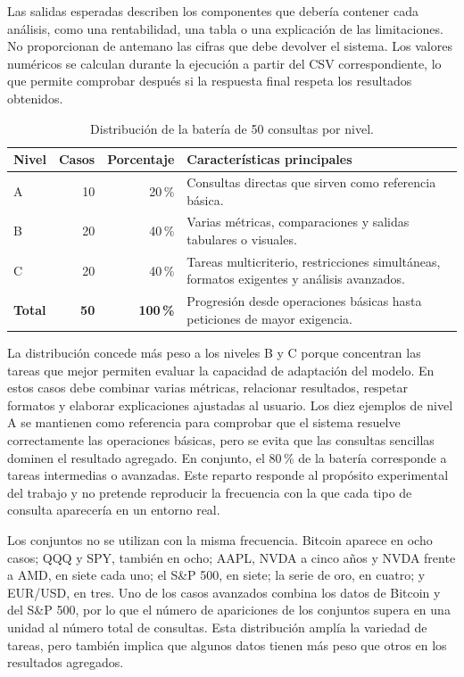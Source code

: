 Las salidas esperadas describen los componentes que debería contener cada análisis, como una rentabilidad, una tabla o una explicación de las limitaciones. No proporcionan de antemano las cifras que debe devolver el sistema. Los valores numéricos se calculan durante la ejecución a partir del CSV correspondiente, lo que permite comprobar después si la respuesta final respeta los resultados obtenidos.

\begin{table}[htbp]
\centering
\small
\begin{tabularx}{\textwidth}{L{0.13\textwidth}r r Y}
\toprule
\textbf{Nivel} & \textbf{Casos} & \textbf{Porcentaje} & \textbf{Características principales} \\
\midrule
A & 10 & 20\,\% & Consultas directas que sirven como referencia básica. \\
B & 20 & 40\,\% & Varias métricas, comparaciones y salidas tabulares o visuales. \\
C & 20 & 40\,\% & Tareas multicriterio, restricciones simultáneas, formatos exigentes y análisis avanzados. \\
\midrule
\textbf{Total} & \textbf{50} & \textbf{100\,\%} & Progresión desde operaciones básicas hasta peticiones de mayor exigencia. \\
\bottomrule
\end{tabularx}
\caption{Distribución de la batería de 50 consultas por nivel.}
\label{tab:distribucion_bateria_50}
\end{table}

La distribución concede más peso a los niveles B y C porque concentran las tareas que mejor permiten evaluar la capacidad de adaptación del modelo. En estos casos debe combinar varias métricas, relacionar resultados, respetar formatos y elaborar explicaciones ajustadas al usuario. Los diez ejemplos de nivel A se mantienen como referencia para comprobar que el sistema resuelve correctamente las operaciones básicas, pero se evita que las consultas sencillas dominen el resultado agregado. En conjunto, el 80\,\% de la batería corresponde a tareas intermedias o avanzadas. Este reparto responde al propósito experimental del trabajo y no pretende reproducir la frecuencia con la que cada tipo de consulta aparecería en un entorno real.

Los conjuntos no se utilizan con la misma frecuencia. Bitcoin aparece en ocho casos; QQQ y SPY, también en ocho; AAPL, NVDA a cinco años y NVDA frente a AMD, en siete cada uno; el S\&P 500, en siete; la serie de oro, en cuatro; y EUR/USD, en tres. Uno de los casos avanzados combina los datos de Bitcoin y del S\&P 500, por lo que el número de apariciones de los conjuntos supera en una unidad al número total de consultas. Esta distribución amplía la variedad de tareas, pero también implica que algunos datos tienen más peso que otros en los resultados agregados.

